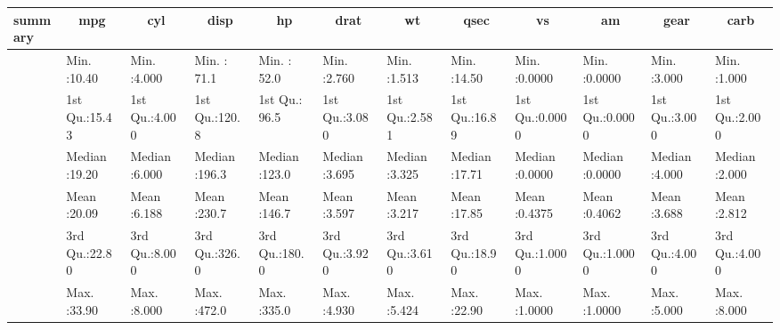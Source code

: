 \begin{table}[!tbp]
\begin{center}
\begin{tabular}{llllllllllll}
\hline\hline
\multicolumn{1}{l}{summary}&\multicolumn{1}{c}{     mpg}&\multicolumn{1}{c}{     cyl}&\multicolumn{1}{c}{     disp}&\multicolumn{1}{c}{      hp}&\multicolumn{1}{c}{     drat}&\multicolumn{1}{c}{      wt}&\multicolumn{1}{c}{     qsec}&\multicolumn{1}{c}{      vs}&\multicolumn{1}{c}{      am}&\multicolumn{1}{c}{     gear}&\multicolumn{1}{c}{     carb}\tabularnewline
\hline
&Min.   :10.40  &Min.   :4.000  &Min.   : 71.1  &Min.   : 52.0  &Min.   :2.760  &Min.   :1.513  &Min.   :14.50  &Min.   :0.0000  &Min.   :0.0000  &Min.   :3.000  &Min.   :1.000  \tabularnewline
&1st Qu.:15.43  &1st Qu.:4.000  &1st Qu.:120.8  &1st Qu.: 96.5  &1st Qu.:3.080  &1st Qu.:2.581  &1st Qu.:16.89  &1st Qu.:0.0000  &1st Qu.:0.0000  &1st Qu.:3.000  &1st Qu.:2.000  \tabularnewline
&Median :19.20  &Median :6.000  &Median :196.3  &Median :123.0  &Median :3.695  &Median :3.325  &Median :17.71  &Median :0.0000  &Median :0.0000  &Median :4.000  &Median :2.000  \tabularnewline
&Mean   :20.09  &Mean   :6.188  &Mean   :230.7  &Mean   :146.7  &Mean   :3.597  &Mean   :3.217  &Mean   :17.85  &Mean   :0.4375  &Mean   :0.4062  &Mean   :3.688  &Mean   :2.812  \tabularnewline
&3rd Qu.:22.80  &3rd Qu.:8.000  &3rd Qu.:326.0  &3rd Qu.:180.0  &3rd Qu.:3.920  &3rd Qu.:3.610  &3rd Qu.:18.90  &3rd Qu.:1.0000  &3rd Qu.:1.0000  &3rd Qu.:4.000  &3rd Qu.:4.000  \tabularnewline
&Max.   :33.90  &Max.   :8.000  &Max.   :472.0  &Max.   :335.0  &Max.   :4.930  &Max.   :5.424  &Max.   :22.90  &Max.   :1.0000  &Max.   :1.0000  &Max.   :5.000  &Max.   :8.000  \tabularnewline
\hline
\end{tabular}\end{center}

\end{table}
